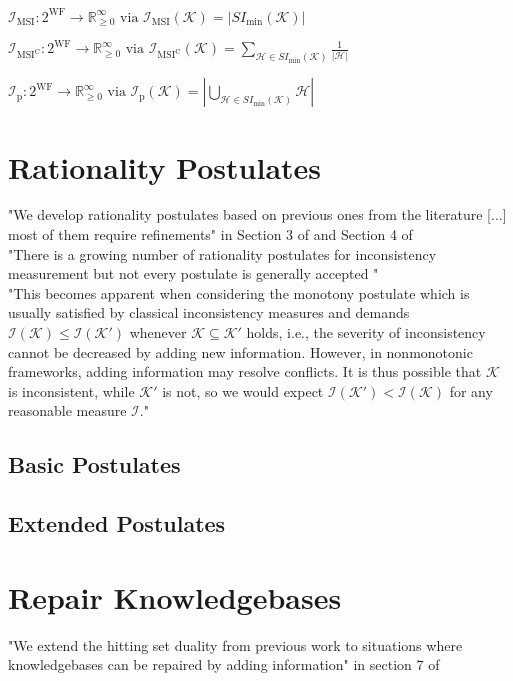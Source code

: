 \(\mathcal{I}_{\text{MSI}}: 2^{\text{WF}} \rightarrow \mathbb{R}_{\geq 0}^{\infty} \text{ via } \mathcal{I}_{\text{MSI}}(\mathcal{K}) = \left| SI_{\min}(\mathcal{K}) \right|\)

\(\mathcal{I}_{\text{MSI}^\text{C}}: 2^{\text{WF}} \rightarrow \mathbb{R}_{\geq 0}^{\infty} \text{ via } \mathcal{I}_{\text{MSI}^\text{C}}(\mathcal{K}) = \sum_{\mathcal{H} \in SI_{\min}(\mathcal{K})} \frac{1}{|\mathcal{H}|}\)
\cite{hunter_measuring_2008}

\(\mathcal{I}_{\text{p}}: 2^{\text{WF}} \rightarrow \mathbb{R}_{\geq 0}^{\infty} \text{ via } \mathcal{I}_{\text{p}}(\mathcal{K}) = \left| \bigcup_{\mathcal{H} \in SI_{\min}(\mathcal{K})} \mathcal{H} \right|\)
\cite{liu_measuring_2011}

\section{Rationality Postulates}
"We develop rationality postulates based on previous ones from the literature [...] most of them require refinements" in Section 3 of \cite{ulbricht_measuring_2018} and Section 4 of \cite{ulbricht_handling_2020}
\\
"There is a growing number of rationality postulates for inconsistency measurement but not every postulate is generally accepted \cite{hameurlain_basic_2017} \cite{ferme_revisiting_2014}"
\\
"This becomes apparent when considering the monotony postulate which is usually satisfied by classical inconsistency measures and demands \(\mathcal{I}(\mathcal{K}) \leq \mathcal{I}(\mathcal{K}')\) whenever \(\mathcal{K} \subseteq \mathcal{K}'\) holds, i.e., the severity of inconsistency cannot be decreased by adding new information. However, in nonmonotonic frameworks, adding information may resolve conflicts. It is thus possible that \(\mathcal{K}\) is inconsistent, while \(\mathcal{K}'\) is not, so we would expect \(\mathcal{I}(\mathcal{K}') < \mathcal{I}(\mathcal{K})\) for any reasonable measure \(\mathcal{I}\)."

\subsection{Basic Postulates}

\subsection{Extended Postulates}

\section{Repair Knowledgebases}
"We extend the hitting set duality from previous work \cite{brewka_strong_2019} to situations where knowledgebases can be repaired by adding information" in section 7 of \cite{ulbricht_handling_2020}
